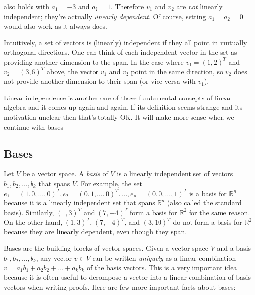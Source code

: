 \documentclass[12pt]{article}
\begin{document}
also holds with $a_1 = -3$ and $a_2 = 1$. Therefore $v_1$ and $v_2$ are \textit{not} linearly independent; they're actually \textit{linearly dependent}. Of course, setting $a_1 = a_2 = 0$ would also work as it always does.

Intuitively, a set of vectors is (linearly) independent if they all point in mutually orthogonal directions. One can think of each independent vector in the set as providing another dimension to the span. In the case where $v_1 = (1, 2)^T$ and $v_2 = (3, 6)^T$ above, the vector $v_1$ and $v_2$ point in the same direction, so $v_2$ does not provide another dimension to their span (or vice versa with $v_1$). 

Linear independence is another one of those fundamental concepts of linear algebra and it comes up again and again. If its definition seems strange and its motivation unclear then that's totally OK. It will make more sense when we continue with bases.

\subsection*{Bases}

Let $V$ be a vector space. A \textit{basis} of $V$ is a linearly independent set of vectors $b_1, b_2, \ldots, b_k$ that spans $V$. For example, the set $e_1 = (1, 0, \ldots, 0)^T, e_2 = (0, 1, \ldots, 0)^T, \ldots, e_n = (0, 0, \ldots, 1)^T$ is a basis for $\mathbb{R}^n$ because it is a linearly independent set that spans $\mathbb{R}^n$ (also called the standard basis).  Similarly, $(1, 3)^T$ and $(7, -4)^T$ form a basis for $\mathbb{R}^2$ for the same reason. On the other hand, $(1, 3)^T$, $(7, -4)^T$, and $(3, 10)^T$ do not form a basis for $\mathbb{R}^2$ because they are linearly dependent, even though they span.

Bases are the building blocks of vector spaces. Given a vector space $V$ and a basis $b_1, b_2, \ldots, b_k$, any vector $v \in V$ can be written \textit{uniquely} as a linear combination $v = a_1 b_1 + a_2 b_2 + \ldots + a_k b_k$ of the basis vectors. This is a very important idea because it is often useful to decompose a vector into a linear combination of basis vectors when writing proofs. Here are few more important facts about bases:
\end{document}
